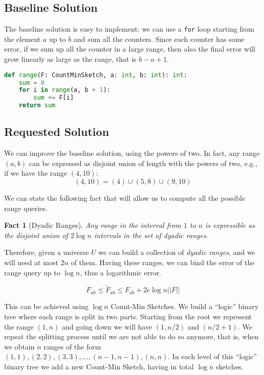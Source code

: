 \documentclass{article}
\newtheorem{fact}[theorem]{Fact}
\begin{document}
\subsection{Baseline Solution}

The baseline solution is easy to implement: we can use a \verb+for+ loop starting from the element $a$ up to $b$ and sum
all the counters. Since each counter has some error, if we sum up all the counter in a large range,
then also the final error will grow linearly as large as the range, that is $b - a + 1$.

\begin{lstlisting}[language=Python,caption=`Range query for integer values']
def range(F: CountMinSketch, a: int, b: int): int:
    sum = 0
    for i in range(a, b + 1):
        sum += F[i]
    return sum
\end{lstlisting}

\subsection{Requested Solution}

\noindent We can improve the baseline solution, using the powers of two. In fact, any range $(a, b)$ can be
expressed as disjoint union of length with the powers of two, e.g., if we have the range $(4, 10)$:
$$
(4, 10) = (4) \cup (5, 8) \cup (9, 10)
$$

\noindent We can state the following fact that will allow us to compute all the possible range queries.

\begin{fact}[Dyadic Ranges]
    Any range in the interval from $1$ to $n$ is expressible as the disjoint union of $2 \log n$ intervals 
    in the set of dyadic ranges.
\end{fact}

\noindent Therefore, given a universe $U$ we can build a collection of \textit{dyadic ranges}, and we will
need at most $2n$ of them. Having these ranges, we can bind the error of the range query up to $\log n$, thus a
logarithmic error.

\begin{equation*}
    F_{ab} \le \tilde{F}_{ab} \le F_{ab} + 2 \epsilon \log{n} ||F||
\end{equation*}

\noindent This can be achieved using $\log n$ Count-Min Sketches. We build a ``logic'' binary tree where each range is split in two parts.
Starting from the root we represent the range $(1, n)$ and going down we will have $(1, n/2)$ and $(n/2 + 1)$. We repeat the splitting process
until we are not able to do so anymore, that is, when we obtain $n$ ranges of the form $(1,1), (2, 2), (3, 3), \dots, (n-1, n-1), (n, n)$.
In each level of this ``logic'' binary tree we add a new Count-Min Sketch, having in total $\log n$ sketches.
\end{document}
